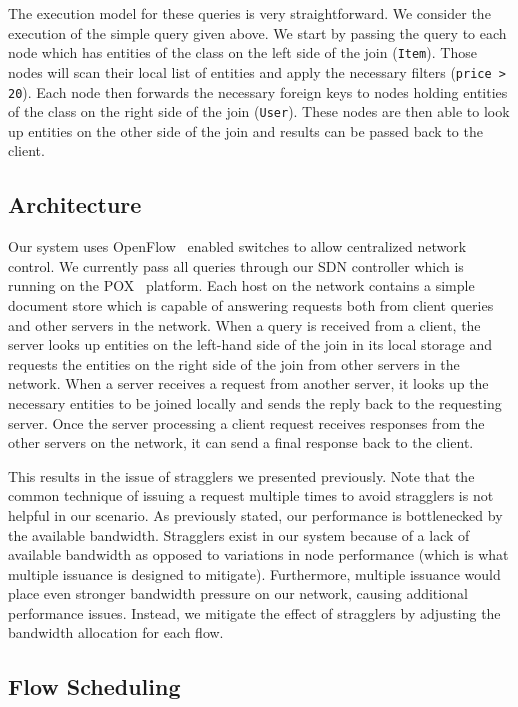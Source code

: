 \documentclass{acm_proc_article-sp}
\begin{document}
The execution model for these queries is very straightforward.
We consider the execution of the simple query given above.
We start by passing the query to each node which has entities of the class on the left side of the join (\texttt{Item}).
Those nodes will scan their local list of entities and apply the necessary filters (\texttt{price > 20}).
Each node then forwards the necessary foreign keys to nodes holding entities of the class on the right side of the join (\texttt{User}).
These nodes are then able to look up entities on the other side of the join and results can be passed back to the client.

\subsection{Architecture}

Our system uses OpenFlow~\cite{McKeown2008} enabled switches to allow centralized network control.
We currently pass all queries through our SDN controller which is running on the POX~\cite{Gude2008} platform.
Each host on the network contains a simple document store which is capable of answering requests both from client queries and other servers in the network.
When a query is received from a client, the server looks up entities on the left-hand side of the join in its local storage and requests the entities on the right side of the join from other servers in the network.
When a server receives a request from another server, it looks up the necessary entities to be joined locally and sends the reply back to the requesting server.
Once the server processing a client request receives responses from the other servers on the network, it can send a final response back to the client.

This results in the issue of stragglers we presented previously.
Note that the common technique of issuing a request multiple times to avoid stragglers is not helpful in our scenario.
As previously stated, our performance is bottlenecked by the available bandwidth.
Stragglers exist in our system because of a lack of available bandwidth as opposed to variations in node performance (which is what multiple issuance is designed to mitigate).
Furthermore, multiple issuance would place even stronger bandwidth pressure on our network, causing additional performance issues.
Instead, we mitigate the effect of stragglers by adjusting the bandwidth allocation for each flow.

\subsection{Flow Scheduling}
\end{document}
